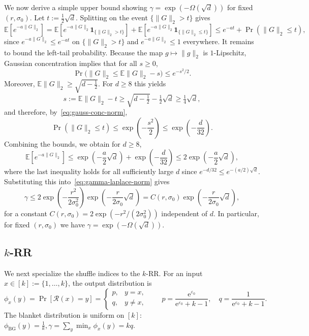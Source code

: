 \documentclass{article}
\theoremstyle{plain}
\theoremstyle{definition}
\begin{document}
We now derive a simple upper bound showing $\gamma=\exp(-\Omega(\sqrt d))$ for
fixed $(r,\sigma_0)$. Let $t:=\frac12\sqrt d$. Splitting on the event
$\{\|G\|_2>t\}$ gives
\[
\mathbb E[e^{-a\|G\|_2}]
=\mathbb E\!\left[e^{-a\|G\|_2}\mathbf 1_{\{\|G\|_2>t\}}\right]
+\mathbb E\!\left[e^{-a\|G\|_2}\mathbf 1_{\{\|G\|_2\le t\}}\right]
\le e^{-at}+\Pr(\|G\|_2\le t),
\]
since $e^{-a\|G\|_2}\le e^{-at}$ on $\{\|G\|_2>t\}$ and
$e^{-a\|G\|_2}\le 1$ everywhere. It remains to bound the left-tail probability.
Because the map $g\mapsto \|g\|_2$ is $1$-Lipschitz, Gaussian concentration
implies that for all $s\ge 0$,
\begin{equation}
\label{eq:gauss-conc-norm}
\Pr\bigl(\|G\|_2\le \mathbb E\|G\|_2-s\bigr)\le e^{-s^2/2}.
\end{equation}
Moreover, $\mathbb E\|G\|_2\ge \sqrt{d-\tfrac12}$. For $d\ge 8$ this yields
\[
s:=\mathbb E\|G\|_2-t
\ge \sqrt{d-\tfrac12}-\tfrac12\sqrt d
\ge \tfrac14\sqrt d,
\]
and therefore, by~\eqref{eq:gauss-conc-norm},
\[
\Pr(\|G\|_2\le t)\le \exp\!\left(-\frac{s^2}{2}\right)
\le \exp\!\left(-\frac{d}{32}\right).
\]
Combining the bounds, we obtain for $d\ge 8$,
\[
\mathbb E[e^{-a\|G\|_2}]
\le \exp\!\left(-\frac{a}{2}\sqrt d\right)+\exp\!\left(-\frac{d}{32}\right)
\le 2\exp\!\left(-\frac{a}{2}\sqrt d\right),
\]
where the last inequality holds for all sufficiently large $d$ since
$e^{-d/32}\le e^{-(a/2)\sqrt d}$. Substituting this into~\eqref{eq:gamma-laplace-norm}
gives
\[
\gamma
\le 2\exp\!\left(-\frac{r^2}{2\sigma_0^2}\right)
\exp\!\left(-\frac{r}{2\sigma_0}\sqrt d\right)
= C(r,\sigma_0)\exp\!\left(-\frac{r}{2\sigma_0}\sqrt d\right),
\]
for a constant $C(r,\sigma_0)=2\exp(-r^2/(2\sigma_0^2))$ independent of $d$.
In particular, for fixed $(r,\sigma_0)$ we have $\gamma=\exp(-\Omega(\sqrt d))$.



\subsection{$k$-RR}

We next specialize the shuffle indices to the $k$-RR. For an input $x\in[k]:=\{1,\dots,k\}$, the output distribution is
\[
  \phi_x(y)
  =
  \Pr[\mathcal R(x)=y]
  =
  \begin{cases}
    p, & y=x,\\[2pt]
    q, & y\neq x,
  \end{cases}
  \qquad
  p=\dfrac{\mathrm e^{\varepsilon_0}}{\mathrm e^{\varepsilon_0}+k-1},\quad
  q=\dfrac{1}{\mathrm e^{\varepsilon_0}+k-1}.
\]
The blanket distribution is uniform on $[k]$:
$
  \phi_{\mathrm{BG}}(y)
  = \frac{1}{k},
  \gamma=\sum_{y}\min_x\phi_x(y)
  = kq.
$
\end{document}
